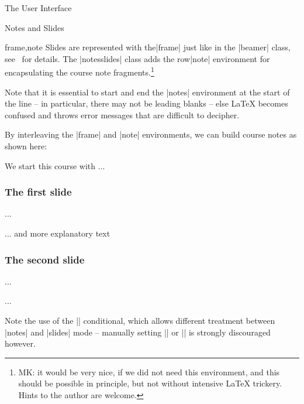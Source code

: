 \begin{sfragment}[id=sec:user]{The User Interface}
\begin{sfragment}[id=sec:user:notesslides]{Notes and Slides}

\begin{environment}{frame,note}
  Slides are represented with the|frame| just like in the |beamer| class,
  see~\cite{Tantau:ugbc} for details. The |notesslides| class adds the row|note|
  environment for encapsulating the course note fragments.\footnote{MK: it would be very
    nice, if we did not need this environment, and this should be possible in principle,
    but not without intensive LaTeX trickery. Hints to the author are welcome.}
\end{environment}
  
\begin{dangerbox}
  Note that it is essential to start and end the |notes| environment at the start of the
  line -- in particular, there may not be leading blanks -- else {\LaTeX} becomes confused
  and throws error messages that are difficult to decipher.
\end{dangerbox}

By interleaving the |frame| and |note| environments, we can build course notes as shown
here:

\begin{latexcode}
\ifnotes\maketitle\else
\frame[noframenumbering]\maketitle\fi

\begin{note}
  We start this course with ...
\end{note}

\begin{frame}
  \frametitle{The first slide}
  ...
\end{frame}
\begin{note}
  ... and more explanatory text
\end{note}

\begin{frame}
  \frametitle{The second slide}
  ...
\end{frame}
...
\end{latexcode}

\begin{function}{\ifnotes}
  Note the use of the |\ifnotes| conditional, which allows different treatment between
  |notes| and |slides| mode -- manually setting |\notestrue| or |\notesfalse| is strongly
  discouraged however.
\end{function}
 

\end{sfragment}
\end{sfragment}
